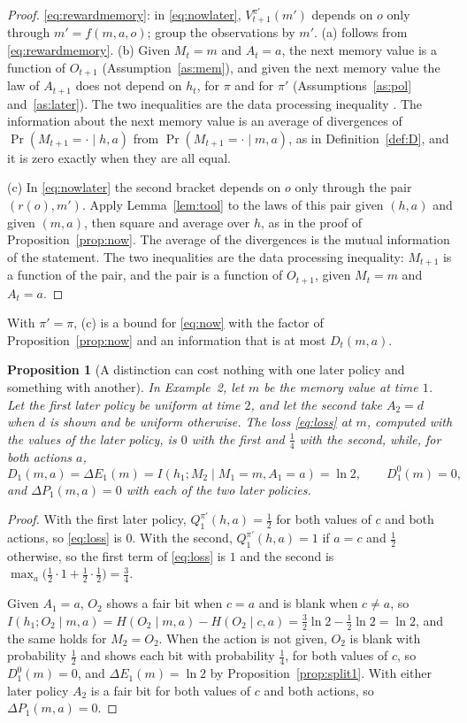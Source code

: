 \documentclass{article}
\newtheorem{proposition}{Proposition}[section]
\theoremstyle{definition}
\newcommand{\dE}{\Delta E}
\newcommand{\dP}{\Delta P}
\begin{document}
\begin{proof}
\eqref{eq:rewardmemory}: in \eqref{eq:nowlater}, $V^{\pi'}_{t+1}(m')$ depends on $o$ only through $m'=f(m,a,o)$; group the observations by $m'$. (a) follows from \eqref{eq:rewardmemory}. (b) Given $M_t=m$ and $A_t=a$, the next memory value is a function of $O_{t+1}$ (Assumption~\ref{as:mem}), and given the next memory value the law of $A_{t+1}$ does not depend on $h_t$, for $\pi$ and for $\pi'$ (Assumptions~\ref{as:pol} and~\ref{as:later}). The two inequalities are the data processing inequality \citep[Ch.~2]{cover2006elements}. The information about the next memory value is an average of divergences of $\Pr(M_{t+1}=\cdot\mid h,a)$ from $\Pr(M_{t+1}=\cdot\mid m,a)$, as in Definition~\ref{def:D}, and it is zero exactly when they are all equal.

(c) In \eqref{eq:nowlater} the second bracket depends on $o$ only through the pair $(r(o),m')$. Apply Lemma~\ref{lem:tool} to the laws of this pair given $(h,a)$ and given $(m,a)$, then square and average over $h$, as in the proof of Proposition~\ref{prop:now}. The average of the divergences is the mutual information of the statement. The two inequalities are the data processing inequality: $M_{t+1}$ is a function of the pair, and the pair is a function of $O_{t+1}$, given $M_t=m$ and $A_t=a$.
\end{proof}

With $\pi'=\pi$, (c) is a bound for \eqref{eq:now} with the factor of Proposition~\ref{prop:now} and an information that is at most $D_t(m,a)$.

\begin{proposition}[A distinction can cost nothing with one later policy and something with another]\label{prop:example}
In Example~2, let $m$ be the memory value at time $1$. Let the first later policy be uniform at time $2$, and let the second take $A_2=d$ when $d$ is shown and be uniform otherwise. The loss \eqref{eq:loss} at $m$, computed with the values of the later policy, is $0$ with the first and $\tfrac14$ with the second, while, for both actions $a$,
\[
D_1(m,a)=\dE_1(m)=I(h_1;M_2\mid M_1=m,A_1=a)=\ln2,\qquad D^0_1(m)=0,
\]
and $\dP_1(m,a)=0$ with each of the two later policies.
\end{proposition}

\begin{proof}
With the first later policy, $Q^{\pi'}_1(h,a)=\tfrac12$ for both values of $c$ and both actions, so \eqref{eq:loss} is $0$. With the second, $Q^{\pi'}_1(h,a)=1$ if $a=c$ and $\tfrac12$ otherwise, so the first term of \eqref{eq:loss} is $1$ and the second is $\max_a\big(\tfrac12\cdot1+\tfrac12\cdot\tfrac12\big)=\tfrac34$.

Given $A_1=a$, $O_2$ shows a fair bit when $c=a$ and is blank when $c\ne a$, so $I(h_1;O_2\mid m,a)=H(O_2\mid m,a)-H(O_2\mid c,a)=\tfrac32\ln2-\tfrac12\ln2=\ln2$, and the same holds for $M_2=O_2$. When the action is not given, $O_2$ is blank with probability $\tfrac12$ and shows each bit with probability $\tfrac14$, for both values of $c$, so $D^0_1(m)=0$, and $\dE_1(m)=\ln2$ by Proposition~\ref{prop:split1}. With either later policy $A_2$ is a fair bit for both values of $c$ and both actions, so $\dP_1(m,a)=0$.
\end{proof}
\end{document}
